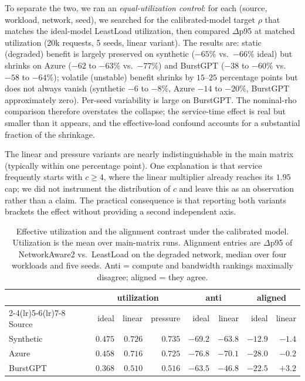 To separate the two, we ran an \emph{equal-utilization control}: for each (source, workload,
network, seed), we searched for the calibrated-model target $\rho$ that matches the ideal-model
LeastLoad utilization, then compared $\Delta$p95 at matched utilization (20k requests, 5 seeds,
linear variant). The results are: static (degraded) benefit is largely preserved on synthetic
($-65\%$ vs.\ $-66\%$ ideal) but shrinks on Azure ($-62$ to $-63\%$ vs.\ $-77\%$) and BurstGPT
($-38$ to $-60\%$ vs.\ $-58$ to $-64\%$); volatile (unstable) benefit shrinks by $15$--$25$
percentage points but does not always vanish (synthetic $-6$ to $-8\%$, Azure $-14$ to $-20\%$,
BurstGPT approximately zero). Per-seed variability is large on BurstGPT. The nominal-rho
comparison therefore overstates the collapse; the service-time effect is real but smaller than it
appears, and the effective-load confound accounts for a substantial fraction of the shrinkage.

The linear and pressure variants are nearly indistinguishable in the main matrix (typically within
one percentage point). One explanation is that service frequently starts with $c\ge4$, where the
linear multiplier already reaches its $1.95$ cap; we did not instrument the distribution of $c$ and
leave this as an observation rather than a claim. The practical consequence is that reporting both
variants brackets the effect without providing a second independent axis.

\begin{table}[t]
\centering
\caption{Effective utilization and the alignment contrast under the calibrated model. Utilization is
the mean over main-matrix runs. Alignment entries are $\Delta$p95 of NetworkAware2 vs.\ LeastLoad
on the degraded network, median over four workloads and five seeds. Anti = compute and bandwidth
rankings maximally disagree; aligned = they agree.}
\label{tab:calibrated-util}
\small
\setlength{\tabcolsep}{4pt}
\begin{tabular}{@{}lrrrrrrr@{}}
\toprule
& \multicolumn{3}{c}{utilization} & \multicolumn{2}{c}{anti} & \multicolumn{2}{c}{aligned} \\
\cmidrule(lr){2-4}\cmidrule(lr){5-6}\cmidrule(lr){7-8}
Source & ideal & linear & pressure & ideal & linear & ideal & linear \\
\midrule
Synthetic & $0.475$ & $0.726$ & $0.735$ & $-69.2$ & $-63.8$ & $-12.9$ & $-1.4$ \\
Azure     & $0.458$ & $0.716$ & $0.725$ & $-76.8$ & $-70.1$ & $-28.0$ & $-0.2$ \\
BurstGPT  & $0.368$ & $0.510$ & $0.516$ & $-63.5$ & $-46.8$ & $-22.5$ & $+3.2$ \\
\bottomrule
\end{tabular}
\end{table}

